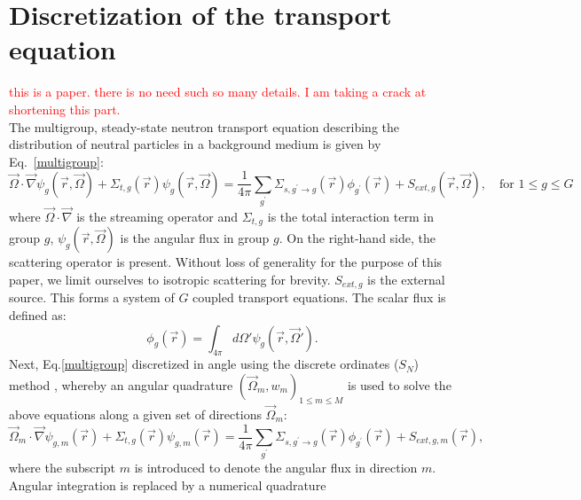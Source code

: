 \documentclass[times,final]{elsarticle}
\newcommand{\vr}{\vec{r}}
\newcommand{\vo}{\vec{\Omega}}
\newcommand{\tcr}[1]{\textcolor{red}{#1}}
\begin{document}
\section{Discretization of the transport equation}\label{cha:transport_sweeps}

\tcr{this is a paper. there is no need such so many details. I am taking a crack at shortening this part.\\}
The multigroup, steady-state neutron transport equation describing the distribution of neutral particles in a background medium is given by Eq.~\ref{multigroup}:
\begin{equation}
\vo \cdot \vec \nabla \psi_g(\vr,\vo) +\Sigma_{t,g}(\vr) \psi_g(\vr,\vo) = \frac{1}{4\pi}\sum_{g^{\prime}}\Sigma_{s,g^{\prime}\to g}(\vr)\phi_{g^{\prime}}(\vr) + S_{ext,g}(\vr,\vo), \quad \text{for } 1 \le g \le G
\label{multigroup}
\end{equation}
where $\vec{\Omega}\cdot \vec\nabla$ is the streaming operator and $\Sigma_{t,g}$ is the total interaction term in group $g$, $\psi_g(\vr,\vo)$ is the angular flux in group $g$. On the right-hand side, the scattering operator is present. Without loss of generality for the purpose of this paper, we limit ourselves to isotropic scattering for brevity. $S_{ext,g}$ is the external source. This forms a system of $G$ coupled transport equations. The scalar flux is defined as:
\begin{equation}
\label{def_scalar_flux}
\phi_g(\vr) = \int_{4\pi}d\Omega' \psi_g(\vr,\vo').
\end{equation}
Next, Eq.\eqref{multigroup} discretized in angle using the discrete ordinates ($S_N$) method \cite{miller_book}, whereby an angular quadrature $\left( \vo_m, w_m \right)_{1 \le m \le M}$ is used to solve the above equations along a given set of directions $\vo_m$:
\begin{equation}
\vo_m \cdot \vec \nabla \psi_{g,m}(\vr) +\Sigma_{t,g}(\vr) \psi_{g,m}(\vr)  = \frac{1}{4\pi}\sum_{g^{\prime}}\Sigma_{s,g^{\prime}\to g}(\vr)\phi_{g^{\prime}}(\vr) + S_{ext,g,m}(\vr),
\label{angle}
\end{equation}
where the subscript $m$ is introduced to denote the angular flux in direction $m$. Angular integration is replaced by a numerical quadrature
\end{document}
